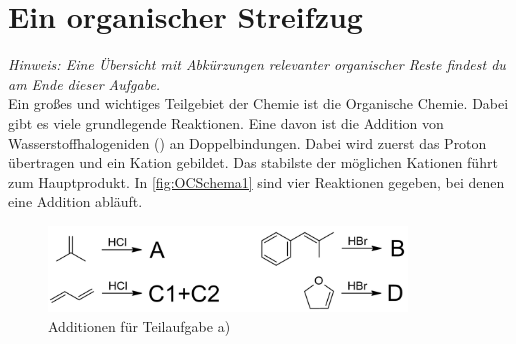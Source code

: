 \documentclass[../kl10.tex]{subfiles}
\begin{document}
\section{Ein organischer Streifzug}
\textit{Hinweis: Eine Übersicht mit Abkürzungen relevanter organischer Reste findest du am Ende dieser Aufgabe.} \vspace{0.1cm}\\
Ein großes und wichtiges Teilgebiet der Chemie ist die Organische Chemie. Dabei gibt es viele grundlegende Reaktionen. Eine davon ist die Addition von Wasserstoffhalogeniden () an Doppelbindungen. Dabei wird zuerst das Proton übertragen und ein Kation gebildet. Das stabilste der möglichen Kationen führt zum Hauptprodukt. In \autoref{fig:OCSchema1}  sind vier Reaktionen gegeben, bei denen eine Addition abläuft.
\begin{figure}[H]
    \centering
    \includegraphics[width=0.85\textwidth]{2024/Abbildungen/Organik/Organik24_1.png}
    \caption{Additionen für Teilaufgabe a)}
    \label{fig:OCSchema1}
\end{figure}
\end{document}
